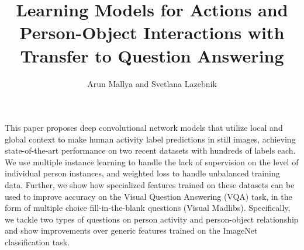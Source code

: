 \documentclass[runningheads]{llncs}
\begin{document}
\pagestyle{headings}
\mainmatter

\title{Learning Models for Actions and Person-Object Interactions with Transfer to Question Answering} 



\author{Arun Mallya and Svetlana Lazebnik}



\maketitle

This paper proposes deep convolutional network models that utilize local and global context to make human activity label predictions in still images, achieving state-of-the-art performance on two recent datasets with hundreds of labels each. We use multiple instance learning to handle the lack of supervision on the level of individual person instances, and weighted loss to handle unbalanced training data. Further, we show how specialized features trained on these datasets can be used to improve accuracy on the Visual Question Answering (VQA) task, in the form of multiple choice fill-in-the-blank questions (Visual Madlibs). Specifically, we tackle two types of questions on person activity and person-object relationship and show improvements over generic features trained on the ImageNet classification task.
\end{document}
